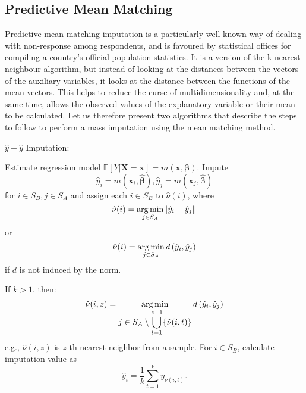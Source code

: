 \documentclass[
]{jss}
\begin{document}
\hypertarget{predictive-mean-matching}{%
\subsection{Predictive Mean Matching}\label{predictive-mean-matching}}

Predictive mean-matching imputation is a particularly well-known way of
dealing with non-response among respondents, and is favoured by
statistical offices for compiling a country's official population
statistics. It is a version of the k-nearest neighbour algorithm, but
instead of looking at the distances between the vectors of the auxiliary
variables, it looks at the distance between the functions of the mean
vectors. This helps to reduce the curse of multidimensionality and, at
the same time, allows the observed values of the explanatory variable or
their mean to be calculated. Let us therefore present two algorithms
that describe the steps to follow to perform a mass imputation using the
mean matching method.

\begin{algorithm}[H]
\caption{$\hat{y}-\hat{y}$ Imputation:}
\label{algo-3}
\begin{algorithmic}[1]
\State Estimate regression model $\mathbb{E}[Y|\boldsymbol{X}=\boldsymbol{x}]=m(\boldsymbol{x}, \boldsymbol{\beta})$.\;
\State Impute $$\hat{y}_{i}=m\left(\boldsymbol{x}_{i},\hat{\boldsymbol{\beta}}\right), 
\hat{y}_{j}=m\left(\boldsymbol{x}_{j},\hat{\boldsymbol{\beta}}\right)$$
for $i\in S_{B}, j\in S_{A}$ and assign each 
$i\in S_{B}$ to $\hat{\nu}(i)$, where
$$\displaystyle \hat{\nu}(i)=
\operatornamewithlimits{arg\,min}_{j\in S_{A}}\lVert \hat{y}_{i}-\hat{y}_{j}\rVert$$ or
$$\displaystyle \hat{\nu}(i)=
\operatornamewithlimits{arg\,min}_{j\in S_{A}}d\left(\hat{y}_{i},\hat{y}_{j}\right)$$ if $d$ is not induced by the norm.\;

\State If $k>1$, then:
$$\hat{\nu}(i, z) = \operatornamewithlimits{arg\,min}_{\displaystyle j\in S_{A}\setminus\bigcup_{t=1}^{z-1}
\{\hat{\nu}(i, t)\}} d\left(\hat{y}_{i},\hat{y}_{j}\right)$$
e.g., $\hat{\nu}(i, z)$ is $z$-th nearest neighbor from a sample.\;
\State For $i \in S_B$, calculate imputation value as 
$$
\hat{y}_i = \frac{1}{k}\sum_{t=1}^{k}y_{\hat{\nu}(i, t)}.
$$
\end{algorithmic}
\end{algorithm}
\end{document}
